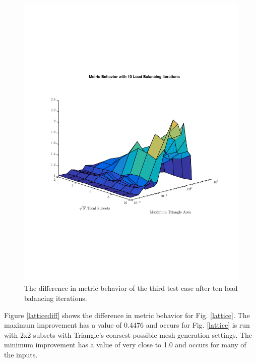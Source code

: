 \documentclass{anstrans}
\begin{document}
\begin{figure}[H]
\centering
\includegraphics[scale=0.5, trim = 2cm 6cm 2cm 7cm,clip]{figures/lattice_iter.pdf}
\caption{The difference in metric behavior of the third test case after ten load balancing iterations.}
\label{latticeiter}
\end{figure}

Figure \ref{latticediff} shows the difference in metric behavior for Fig. \ref{lattice}. The maximum improvement has a value of 0.4476 and occurs for Fig. \ref{lattice} is run with 2x2 subsets with Triangle's coarsest possible mesh generation settings. The minimum improvement has a value of very close to 1.0 and occurs for many of the inputs. 
\end{document}
